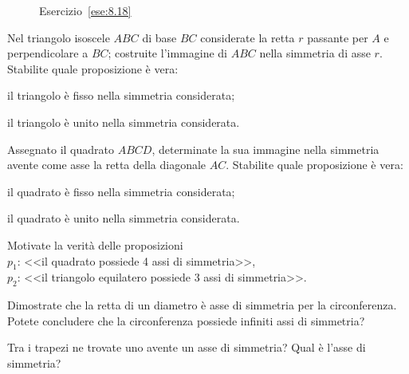 \begin{inaccessibleblock}
 \begin{figure}[!htb]
  \centering
  \caption{Esercizio~\ref{ese:8.18}}\label{fig:ese8.18}
\end{figure}
\end{inaccessibleblock}

\begin{esercizio}
\label{ese:8.19}
Nel triangolo isoscele \(ABC\) di base \(BC\) considerate la retta \(r\) 
passante per \(A\) e perpendicolare a \(BC\); costruite l'immagine di 
\(ABC\) nella simmetria di asse \(r\). Stabilite quale proposizione è 
vera:
\begin{enumeratea}
\item il triangolo è fisso nella simmetria considerata;
\item il triangolo è unito nella simmetria considerata.
\end{enumeratea}
\end{esercizio}

\begin{esercizio}
\label{ese:8.20}
Assegnato il quadrato \(ABCD\), determinate la sua immagine nella 
simmetria avente come asse la retta della diagonale \(AC\). Stabilite 
quale proposizione è vera:
\begin{enumeratea}
\item il quadrato è fisso nella simmetria considerata;
\item il quadrato è unito nella simmetria considerata.
\end{enumeratea}
\end{esercizio}

\begin{esercizio}
\label{ese:8.21}
Motivate la verità delle proposizioni\\
\(p_1\): <<il quadrato possiede 4 assi di simmetria>>,\\
\(p_2\): <<il triangolo equilatero possiede 3 assi di simmetria>>.
\end{esercizio}

\begin{esercizio}
\label{ese:8.22}
Dimostrate che la retta di un diametro è asse di simmetria per la 
circonferenza. Potete concludere che la circonferenza possiede 
infiniti assi di simmetria?
\end{esercizio}

\begin{esercizio}
\label{ese:8.23}
Tra i trapezi ne trovate uno avente un asse di simmetria? Qual è 
l'asse di simmetria? 
\end{esercizio}

